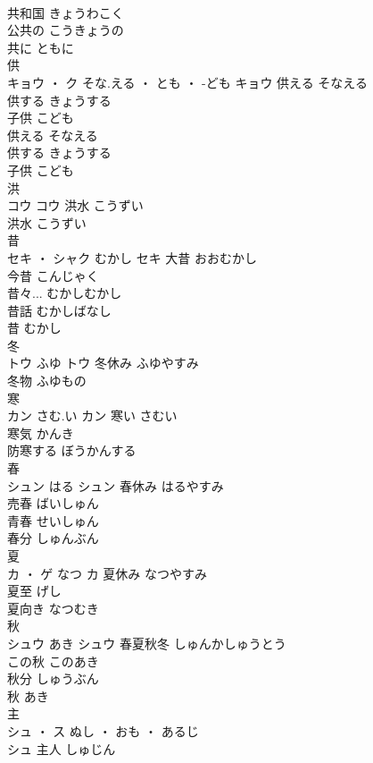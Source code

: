 \documentclass[8pt]{extreport}
\begin{document}
\begin{CJK}{UTF8}{min}
\\	共和国	きょうわこく	
\\	公共の	こうきょうの	
\\	共に	ともに	
\\	供	
\\	キョウ ・ ク	そな.える ・ とも ・ -ども	キョウ	供える	そなえる	
\\	供する	きょうする	
\\	子供	こども	
\\	供える	そなえる	
\\	供する	きょうする	
\\	子供	こども	
\\	洪	
\\	コウ		コウ	洪水	こうずい	
\\	洪水	こうずい	
\\	昔	
\\	セキ ・ シャク	むかし	セキ	大昔	おおむかし	
\\	今昔	こんじゃく	
\\	昔々...	むかしむかし	
\\	昔話	むかしばなし	
\\	昔	むかし	
\\	冬	
\\	トウ	ふゆ	トウ	冬休み	ふゆやすみ	
\\	冬物	ふゆもの	
\\	寒	
\\	カン	さむ.い	カン	寒い	さむい	
\\	寒気	かんき	
\\	防寒する	ぼうかんする	
\\	春	
\\	シュン	はる	シュン	春休み	はるやすみ	
\\	売春	ばいしゅん	
\\	青春	せいしゅん	
\\	春分	しゅんぶん	
\\	夏	
\\	カ ・ ゲ	なつ	カ	夏休み	なつやすみ	
\\	夏至	げし	
\\	夏向き	なつむき	
\\	秋	
\\	シュウ	あき	シュウ	春夏秋冬	しゅんかしゅうとう	
\\	この秋	このあき	
\\	秋分	しゅうぶん	
\\	秋	あき	
\\	主	
\\	シュ ・ ス	ぬし ・ おも ・ あるじ
\\	シュ	主人	しゅじん	

\end{CJK}
\end{document}
